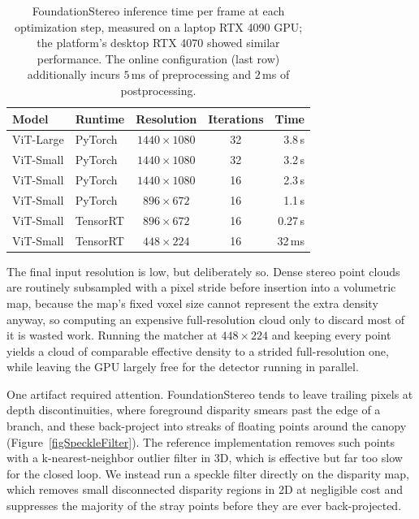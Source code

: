 \begin{table}[h]
\centering
\caption{FoundationStereo inference time per frame at each optimization
         step, measured on a laptop RTX 4090 GPU; the platform's desktop
         RTX 4070 showed similar performance. The online configuration
         (last row) additionally incurs $5$\,ms of preprocessing and
         $2$\,ms of postprocessing.}
\label{tabStereoTiming}
\small
\setlength{\tabcolsep}{6pt}
\begin{tabular}{l l c c r}
\toprule
Model & Runtime & Resolution & Iterations & Time \\
\midrule
ViT-Large & PyTorch  & $1440\times1080$ & 32 & 3.8\,s \\
ViT-Small & PyTorch  & $1440\times1080$ & 32 & 3.2\,s \\
ViT-Small & PyTorch  & $1440\times1080$ & 16 & 2.3\,s \\
ViT-Small & PyTorch  & $896\times672$   & 16 & 1.1\,s \\
ViT-Small & TensorRT & $896\times672$   & 16 & 0.27\,s \\
ViT-Small & TensorRT & $448\times224$   & 16 & 32\,ms \\
\bottomrule
\end{tabular}
\end{table}

The final input resolution is low, but deliberately so. Dense stereo point
clouds are routinely subsampled with a pixel stride before insertion into
a volumetric map, because the map's fixed voxel size cannot represent the
extra density anyway, so computing an expensive full-resolution cloud only
to discard most of it is wasted work. Running the matcher at $448\times224$
and keeping every point yields a cloud of comparable effective density to
a strided full-resolution one, while leaving the GPU largely free for the
detector running in parallel.

One artifact required attention. FoundationStereo tends to leave trailing
pixels at depth discontinuities, where foreground disparity smears past
the edge of a branch, and these back-project into streaks of floating
points around the canopy (Figure~\ref{figSpeckleFilter}). The reference
implementation removes such points with a k-nearest-neighbor outlier
filter in 3D, which is effective but far too slow for the closed loop. We
instead run a speckle filter directly on the disparity map, which removes
small disconnected disparity regions in 2D at negligible cost and
suppresses the majority of the stray points before they are ever
back-projected.

